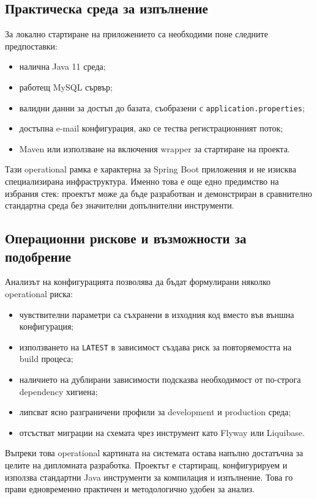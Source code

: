 \subsection{Практическа среда за изпълнение}

За локално стартиране на приложението са необходими поне следните предпоставки:

\begin{itemize}[leftmargin=*]
    \item налична Java 11 среда;
    \item работещ MySQL сървър;
    \item валидни данни за достъп до базата, съобразени с \texttt{application.properties};
    \item достъпна e-mail конфигурация, ако се тества регистрационният поток;
    \item Maven или използване на включения wrapper за стартиране на проекта.
\end{itemize}

Тази operational рамка е характерна за Spring Boot приложения и не изисква специализирана инфраструктура. Именно това е още едно предимство на избрания стек: проектът може да бъде разработван и демонстриран в сравнително стандартна среда без значителни допълнителни инструменти.

\subsection{Операционни рискове и възможности за подобрение}

Анализът на конфигурацията позволява да бъдат формулирани няколко operational риска:

\begin{itemize}[leftmargin=*]
    \item чувствителни параметри са съхранени в изходния код вместо във външна конфигурация;
    \item използването на \texttt{LATEST} в зависимост създава риск за повторяемостта на build процеса;
    \item наличието на дублирани зависимости подсказва необходимост от по-строга dependency хигиена;
    \item липсват ясно разграничени профили за development и production среда;
    \item отсъстват миграции на схемата чрез инструмент като Flyway или Liquibase.
\end{itemize}

Въпреки това operational картината на системата остава напълно достатъчна за целите на дипломната разработка. Проектът е стартиращ, конфигурируем и използва стандартни Java инструменти за компилация и изпълнение. Това го прави едновременно практичен и методологично удобен за анализ.

